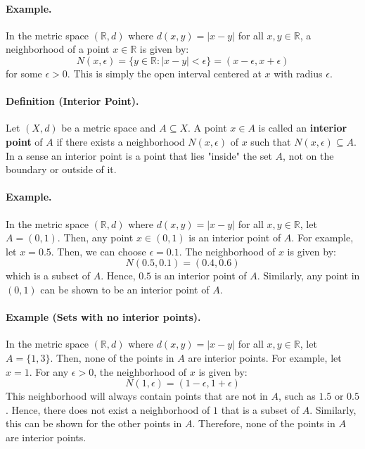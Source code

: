 \documentclass[openany]{book}
\numberwithin{equation}{section}
\begin{document}
\paragraph{Example.}

    In the metric space $(\mathbb{R}, d)$ where $d(x, y) = |x - y|$ for all $x, y \in \mathbb{R}$, a neighborhood of a point $x \in \mathbb{R}$ is given by:
    $$N(x, \epsilon) = \{y \in \mathbb{R}: |x - y| < \epsilon\} = (x - \epsilon, x + \epsilon)$$
    for some $\epsilon > 0$. This is simply the open interval centered at $x$ with radius $\epsilon$. 
\par
\paragraph{Definition (Interior Point).}

    Let $(X, d)$ be a metric space and $A \subseteq X$. A point $x \in A$ is called an \textbf{interior point} of $A$ if there exists a neighborhood $N(x, \epsilon)$ of $x$ such that $N(x, \epsilon) \subseteq A$.
    In a sense an interior point is a point that lies "inside" the set $A$, not on the boundary or outside of it.
\par
\paragraph{Example.}

    In the metric space $(\mathbb{R}, d)$ where $d(x, y) = |x - y|$ for all $x, y \in \mathbb{R}$, let $A = (0, 1)$. Then, any point $x \in (0, 1)$ is an interior point of $A$. For example, let $x = 0.5$. Then, we can choose $\epsilon = 0.1$. The neighborhood of $x$ is given by:
    $$N(0.5, 0.1) = (0.4, 0.6)$$
    which is a subset of $A$. Hence, $0.5$ is an interior point of $A$. Similarly, any point in $(0, 1)$ can be shown to be an interior point of $A$.
\par
\paragraph{Example (Sets with no interior points).}

    In the metric space $(\mathbb{R}, d)$ where $d(x, y) = |x - y|$ for all $x, y \in \mathbb{R}$, let $A = \{1, 3\}$. Then, none of the points in $A$ are interior points. For example, let $x = 1$. For any $\epsilon > 0$, the neighborhood of $x$ is given by:
    $$N(1, \epsilon) = (1 - \epsilon, 1 + \epsilon)$$
    This neighborhood will always contain points that are not in $A$, such as $1.5$ or $0.5$. Hence, there does not exist a neighborhood of $1$ that is a subset of $A$. Similarly, this can be shown for the other points in $A$. Therefore, none of the points in $A$ are interior points.
\par
\end{document}

